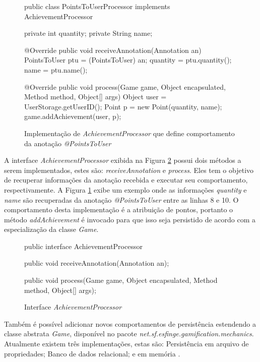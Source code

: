 \begin{figure}[H]
    \centering
    \caption{Implementação de \textit{AchievementProcessor} que define comportamento da anotação \textit{@PointsToUser}}
\begin{java}
public class PointsToUserProcessor implements AchievementProcessor {
	
	private int quantity;
	private String name;

	@Override
	public void receiveAnnotation(Annotation an) {
		PointsToUser ptu = (PointsToUser) an;
		quantity = ptu.quantity();
		name = ptu.name();
	}

	@Override
	public void process(Game game, Object encapsulated, Method method, Object[] args) {
		Object user = UserStorage.getUserID();
		Point p = new Point(quantity, name);
		game.addAchievement(user, p);
	}
}
    \end{java}
    \label{fig:achievement-processor-implementado}
\end{figure}

\par A interface \textit{AchievementProcessor} exibida na Figura \ref{fig:achievement-processor} possui dois métodos a serem implementados, estes são: \textit{receiveAnnotation} e \textit{process}. Eles tem o objetivo de recuperar informações da anotação recebida e executar seu comportamento, respectivamente. A Figura \ref{fig:achievement-processor-implementado} exibe um exemplo onde as informações \textit{quantity} e \textit{name} são recuperadas da anotação \textit{@PointsToUser} entre as linhas 8 e 10. O comportamento desta implementação é a atribuição de pontos, portanto o método \textit{addAchievement} é invocado para que isso seja persistido de acordo com a especialização da classe \textit{Game}.

\begin{figure}[H]
    \centering
    \caption{Interface \textit{AchievementProcessor}}
    \begin{java}
public interface AchievementProcessor {
	
	public void receiveAnnotation(Annotation an);
	
	public void process(Game game, Object encapsulated, Method method, Object[] args);

}
    \end{java}
    \label{fig:achievement-processor}
\end{figure}

Também é possível adicionar novos comportamentos de persistência estendendo a classe abstrata \textit{Game}, disponível no pacote \textit{net.sf.esfinge.gamification.mechanics}. Atualmente existem três implementações, estas são: Persistência em arquivo de propriedades; Banco de dados relacional; e em memória \cite{esfingegamification2011}.

